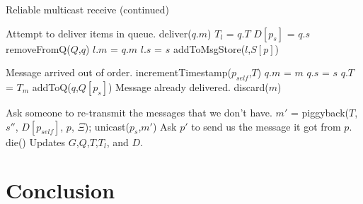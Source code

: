 \documentclass[]{article}
\begin{document}
\begin{algorithm}
\ContinuedFloat
\caption{Reliable multicast receive (continued)}
\begin{algorithmic}
		\Repeat
			\Comment Attempt to deliver items in queue.
				\State deliver($q.m$)
				\State $T_l$ = $q.T$
				\State $D[p_s]$ = $q.s$
				\State removeFromQ($Q$,$q$)
				\State $l.m$ = $q.m$
				\State $l.s$ = $s$
				\State addToMsgStore($l$,$S[p]$)
			\EndFor
		
		\Comment Message arrived out of order.
		\State incrementTimestamp($p_{self}$,$T$)
		\State $q.m$ = $m$
		\State $q.s$ = $s$
		\State $q.T$ = $T_m$
		\State addToQ($q$,$Q[p_s]$)
	\Else
		\Comment Message already delivered.
		\State discard($m$)
	\EndIf
\EndIf

\State \Comment Ask someone to re-transmit the messages that we don't have.
			\State $m'$ = piggyback($T$, $s''$, $D[p_{self}]$, $p$, $\Xi$);
			\State unicast($p_s$,$m'$)
			\Comment Ask $p'$ to send us the message it got from $p$.
		\EndIf
\EndFor
{}
	\State die()
\EndIf
\EndProcedure
\Comment Updates $G$,$Q$,$T$,$T_l$, and $D$.
\end{algorithmic}
\end{algorithm}

\section{Conclusion}
\end{document}
